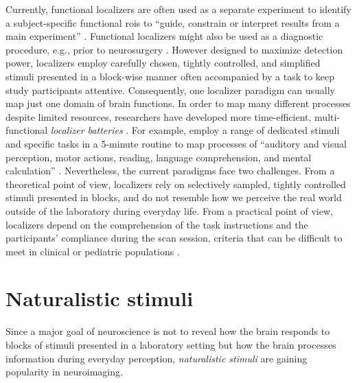 Currently, functional localizers are often used as a separate experiment to
identify a subject-specific functional \acp{roi} to ``guide, constrain or
interpret results from a main experiment'' \citep{saxe2006divide}.
Functional localizers might also be used as a diagnostic procedure, e.g., prior
to neurosurgery \citep[cf.][]{silva2018challenges, szaflarski2017practice}.
However designed to maximize detection power, localizers employ carefully
chosen, tightly controlled, and simplified stimuli presented in a block-wise
manner often accompanied by a task to keep study participants attentive.
Consequently, one localizer paradigm can usually map just one domain of brain
functions.
In order to map many different processes despite limited resources, researchers
have developed more time-efficient, multi-functional \textit{localizer
batteries} \citep[e.g.,][]{barch2013function, drobyshevsky2006rapid,
pinho2018individual, pinho2020individual, pinel2007fast}.
For example, \citet{pinel2007fast} employ a range of dedicated stimuli and
specific tasks in a 5-minute routine to map processes of ``auditory and visual
perception, motor actions, reading, language comprehension, and mental
calculation'' \citep{pinel2007fast}.
Nevertheless, the current paradigms face two challenges.
From a theoretical point of view, localizers rely on selectively sampled,
tightly controlled stimuli presented in blocks, and do not resemble how we
perceive the real world outside of the laboratory during everyday life.
From a practical point of view, localizers depend on the comprehension of the
task instructions and the participants' compliance during the scan session,
criteria that can be difficult to meet in clinical or pediatric populations
\citep{eickhoff2020towards, vanderwal2015inscapes, vanderwal2019movies}.


\section{Naturalistic stimuli}
Since a major goal of neuroscience is not to reveal how the brain responds to
blocks of stimuli presented in a laboratory setting but how the brain processes
information during everyday perception, \textit{naturalistic stimuli} are
gaining popularity in neuroimaging.

